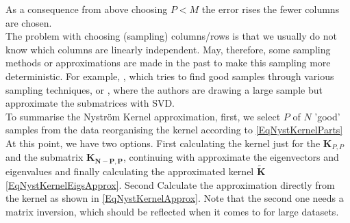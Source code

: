 As a consequence from above choosing $P< M$ the error rises the fewer columns are chosen.\cite{Williams.2000}\\
The problem with choosing (sampling) columns/rows is that we usually do not know which columns are linearly independent.
May, therefore, some sampling methods or approximations are made in the past to make this sampling more deterministic.
For example, \cite{Kumar.2012}, which tries to find good samples through various sampling techniques, or \cite{Li.2015}, where the authors are drawing a large sample but approximate the submatrices with \ac{SVD}.\\
To summarise the Nyström Kernel approximation, first, we select $P$ of $N$ 'good' samples from the data reorganising the kernel according to \eqref{EqNystKernelParts}
At this point, we have two options.
First calculating the kernel just for the $\mathbf{K}_{P, P}$ and the submatrix $\mathbf{K_{N-P, P}}$, continuing with approximate the eigenvectors and eigenvalues and finally calculating the approximated kernel $\tilde{\mathbf{K}}$ \eqref{EqNystKernelEigsApprox}.
Second Calculate the approximation directly from the kernel as shown in \ref{EqNystKernelApprox}.
Note that the second one needs a matrix inversion, which should be reflected when it comes to for large datasets.


